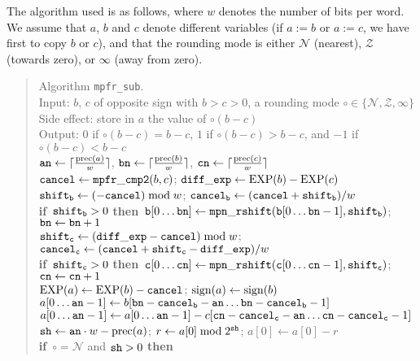 \documentclass[12pt]{amsart}
\def\Exp{{\rm EXP}}
\def\prec{{\rm prec}}
\def\sign{{\rm sign}}
\def\Z{{\mathcal Z}}
\def\N{{\mathcal N}}
\def\If{{\bf if}}
\def\then{{\bf then}}
\begin{document}
The algorithm used is as follows, where $w$ denotes the number of bits
per word. We assume that $a$, $b$ and $c$ denote different variables
(if $a:=b$ or $a:=c$, we have first to copy $b$ or $c$), and
that the rounding mode is either $\N$ (nearest),
$\Z$ (towards zero), or $\infty$ (away from zero).
\begin{quote}
Algorithm {\tt mpfr\_sub}. \\
Input: $b$, $c$ of opposite sign with $b > c > 0$, a rounding mode 
$\circ \in \{ \N, \Z, \infty \}$ \\
Side effect: store in $a$ the value of $\circ(b - c)$ \\
Output: $0$ if $\circ(b - c) = b-c$, $1$ if $\circ(b - c) > b-c$,
	and $-1$ if $\circ(b - c) < b-c$ \\
${\tt an} \leftarrow \lceil \frac{\prec(a)}{w} \rceil$, 
${\tt bn} \leftarrow \lceil \frac{\prec(b)}{w} \rceil$, 
${\tt cn} \leftarrow \lceil \frac{\prec(c)}{w} \rceil$ \\
${\tt cancel} \leftarrow {\tt mpfr\_cmp2}(b, c)$; \quad
	${\tt diff\_exp} \leftarrow \Exp(b)-\Exp(c)$ \\
${\tt shift_b} \leftarrow (-{\tt cancel}) \bmod w$; \quad
	${\tt cancel_b} \leftarrow ({\tt cancel} + {\tt shift_b})/w$ \\
\If\ ${\tt shift_b} > 0$ \then\
	${\tt b}[0 \dots \mbox{\tt bn}] \leftarrow
	{\tt mpn\_rshift}({\tt b}[0 \dots {\tt bn}-1], {\tt shift_b})$;
	${\tt bn} \leftarrow {\tt bn} + 1$ \\
${\tt shift_c} \leftarrow ({\tt diff\_exp}-{\tt cancel}) \bmod w$; \quad
${\tt cancel_c} \leftarrow ({\tt cancel} + {\tt shift_c}-{\tt diff\_exp})/w$ \\
\If\ ${\tt shift_c} > 0$ \then\
	${\tt c}[0 \dots \mbox{\tt cn}] \leftarrow
	{\tt mpn\_rshift}({\tt c}[0 \dots {\tt cn}-1], {\tt shift_c})$;
	${\tt cn} \leftarrow {\tt cn} + 1$ \\
$\Exp(a) \leftarrow \Exp(b) - {\tt cancel}$; \quad
	$\sign(a) \leftarrow \sign(b)$ \\
$a[0 \dots {\tt an}-1] \leftarrow b[{\tt bn} - {\tt cancel_b} - {\tt an}
	\dots {\tt bn} - {\tt cancel_b} - 1]$ \\
$a[0 \dots {\tt an}-1] \leftarrow a[0 \dots {\tt an}-1] - c[{\tt cn} -
	{\tt cancel_c} - {\tt an} \dots {\tt cn} - {\tt cancel_c} - 1]$ \\
${\tt sh} \leftarrow {\tt an} \cdot w - \prec(a)$; \quad
	$r \leftarrow a[0] \bmod 2^{\tt sh}$; \quad
	$a[0] \leftarrow a[0] - r$ \\
\If\ $\circ = \N$ and ${\tt sh} > 0$ \then \\

\end{quote}
\end{document}
